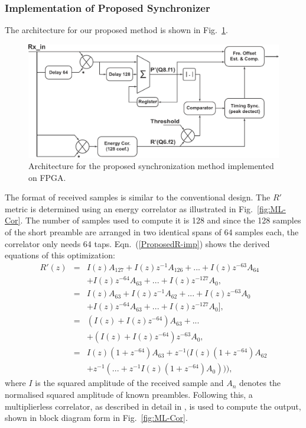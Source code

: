 		\subsubsection{Implementation of Proposed Synchronizer}

The architecture for our proposed method is shown in Fig.~\ref{fig:Pro-Sync}.

\begin{figure}[h]
	\centerline{\includegraphics [width=1\columnwidth] {figures/Pro_Sync.pdf}}
	\caption{Architecture for the proposed synchronization method implemented on FPGA.}
	\label{fig:Pro-Sync}
\end{figure}

The format of received samples is similar to the conventional design.
The $R'$ metric is determined using an energy correlator as illustrated in Fig.~\ref{fig:ML-Cor}.
The number of samples used to compute it is 128 and since the 128 samples of the short preamble are arranged in two identical spans of 64 samples each, the correlator only needs 64 taps.
Eqn.~(\ref{ProposedR-imp}) shows the derived equations of this optimization:
\begin{eqnarray}
\label{ProposedR-imp}
R'(z) &=& I(z)A_{127} + I(z) z^{-1}A_{126} + ... + I(z) z^{-63}A_{64} \nonumber \\
	  &  &	+ I(z) z^{-64}A_{63} + ...+ I(z) z^{-127}A_0, \nonumber \\
	  &=& I(z)A_{63}   + I(z) z^{-1}A_{62}  +...+ I(z) z^{-63}A_0 \nonumber \\
	  &  &	+ I(z) z^{-64}A_{63} + ...+I(z) z^{-127} A_0], \nonumber \\
	  &=& (I(z)+I(z)z^{-64})A_{63} +... \nonumber \\
	  &  & 	+ (I(z)+I(z)z^{-64}) z^{-63}A_0, \nonumber \\
	  &=&I(z) (1+z^{-64})A_{63} +  z^{-1}(I(z)(1+z^{-64})A_{62}\nonumber \\
	  &	&						 + z^{-1 }( ...+z^{-1}I(z)(1+z^{-64})A_{0}))),
\end{eqnarray}
where $I$ is the squared amplitude of the received sample and $A_n$ denotes the normalised squared amplitude of known preambles.
Following this, a multiplierless correlator, as described in detail in \cite{Pham2012}, is used to compute the output, shown in block diagram form in Fig.~\ref{fig:ML-Cor}.

